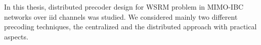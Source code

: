 In this thesis, distributed precoder design for \ac{WSRM} problem in \ac{MIMO}-\ac{IBC} networks over \ac{iid} channels was studied. We considered mainly two different precoding techniques, the centralized and the distributed approach with practical  aspects. 

